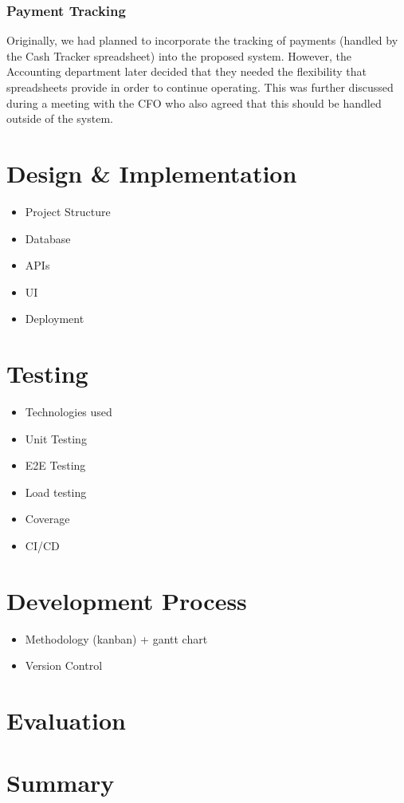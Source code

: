 \documentclass[12pt]{article}
\begin{document}
\subsubsection*{Payment Tracking}
Originally, we had planned to incorporate the tracking of payments (handled by the Cash Tracker spreadsheet) into the proposed system. However, the Accounting department later decided that they needed the flexibility that spreadsheets provide in order to continue operating. This was further discussed during a meeting with the CFO who also agreed that this should be handled outside of the system.

\section{Design \& Implementation}
\begin{itemize}
    \item Project Structure
    \item Database
    \item APIs
    \item UI
    \item Deployment
\end{itemize}

\section{Testing}
\begin{itemize}
    \item Technologies used
    \item Unit Testing
    \item E2E Testing
    \item Load testing
    \item Coverage
    \item CI/CD
\end{itemize}

\section{Development Process}
\begin{itemize}
    \item Methodology (kanban) + gantt chart
    \item Version Control
\end{itemize}

\section{Evaluation}

\section{Summary}



\end{document}
